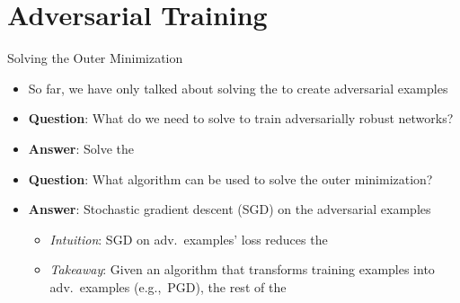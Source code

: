 \section{Adversarial Training}


\begin{frame}{Solving the Outer Minimization}

  \begin{itemize}[<+->]
    \item So far, we have only talked about solving the  to create adversarial examples

    \vspace{10pt}
    \item \textbf{Question}: What do we need to solve to train adversarially robust networks?
    \vspace{3pt}
    \item \textbf{Answer}: Solve the 

    \vspace{10pt}
    \item \textbf{Question}: What algorithm can be used to solve the outer minimization?
    \vspace{3pt}
    \item \textbf{Answer}: Stochastic gradient descent (SGD) on the adversarial examples
      \begin{itemize}[<+->]
        \setlength{\itemsep}{4pt}
        \item \textit{Intuition}: SGD on adv.\ examples' loss reduces the 
        \item \textit{Takeaway}: Given an algorithm that transforms training examples into adv.\ examples (e.g.,~PGD), the rest of the \textbf{}
      \end{itemize}
  \end{itemize}
\end{frame}



